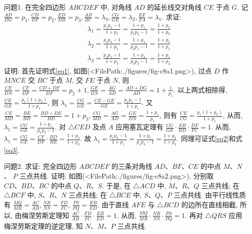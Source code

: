 
问题1. 在完全四边形 $A B C D E F$ 中, 对角线 $A D$ 的延长线交对角线 $C E$ 于点 $G$. 记 $\frac{A D}{D G}=p_1, \frac{C D}{D F}=p_2, \frac{E D}{D B}=p_3, \frac{A B}{B C}=\lambda_3, \frac{C G}{G E}=\lambda_2, \frac{E F}{F A}=\lambda_1$. 求证:
$$
\begin{aligned}
& \lambda_1=\frac{p_1 p_2-1}{1+p_1}=\frac{1+p_1}{p_1 p_3-1}=\frac{1+p_2}{1+p_3} \label{eq1} \\
& \lambda_2=\frac{p_2 p_3-1}{1+p_2}=\frac{1+p_2}{p_2 p_1-1}=\frac{1+p_3}{1+p_1} \label{eq2} \\
& \lambda_3=\frac{p_3 p_1-1}{1+p_3}=\frac{1+p_3}{p_3 p_2-1}=\frac{1+p_1}{1+p_2} \label{eq3}
\end{aligned}
$$
证明: 首先证明式\ref{eq1}, 如图(<FilePath:./figures/fig-c8a1.png>), 过点 $D$ 作 $M N C E$ 交 $B C$ 于点 $M$, 交 $F E$ 于点 $N$, 则 $\frac{C E}{D N}=\frac{C F}{D F}= \frac{C D+D F}{D F}=p_2+1, \frac{G E}{D N}=\frac{A G}{A D}=\frac{A D+D G}{A D}=1+ \frac{1}{p_1}$. 以上两式相除得, $\frac{C E}{G E}=\frac{p_1\left(1+p_2\right)}{1+p_1}$, 则 $\lambda_1=\frac{C G}{G E}= \frac{C E-G E}{G E}=\frac{p_1 p_2-1}{1+p_1}$. 又 $\frac{C E}{M D}=\frac{B E}{B D}=\frac{B D+D E}{B D}=1+p_3, \frac{C G}{M D}=\frac{A G}{A D}=\frac{G E}{D N}=\frac{1+p_1}{p_1}$, 则有 $\frac{C E}{C G}=\frac{p_1\left(1+p_3\right)}{1+p_1}$, 从而, $\lambda_1=\frac{C G}{G E}= \frac{1+p_1}{p_1 p_3-1}$. 对 $\triangle C E D$ 及点 $A$ 应用塞瓦定理有 $\frac{C G}{G E} \cdot \frac{E B}{B D} \cdot \frac{D F}{F C}=1$. 从而, $\lambda_1= \frac{C G}{G E}=\frac{C F}{D F} \cdot \frac{B D}{B E}=\frac{1+p_2}{1+p_3}$. 故 $\lambda_1=\frac{p_1 p_2-1}{1+p_1}=\frac{1+p_1}{p_1 p_3-1}=\frac{1+p_2}{1+p_3}$.
同理可证式\ref{eq2}和式\ref{eq3}.



问题2. 求证: 完全四边形 $A B C D E F$ 的三条对角线 $A D 、 B F 、 C E$ 的中点 $M 、 N$ 、 $P$ 三点共线.
证明: 如图(<FilePath:./figures/fig-c8a2.png>), 分别取 $C D 、 B D 、 B C$ 的中点 $Q 、 R 、 S$.
于是, 在 $\triangle A C D$ 中, $M 、 R 、 Q$ 三点共线; 在 $\triangle B C F$ 中, $S 、 R 、 N$ 三点共线; 在 $\triangle B C E$ 中, $S 、 Q 、 P$ 三点共线.
由平行线性质有 $\frac{M Q}{M R}=\frac{A C}{A B}, \frac{N R}{N S}=\frac{F D}{F C}$,
$\frac{P S}{P Q}=\frac{E B}{E D}$. 由于直线 $A F E$ 与 $\triangle B C D$ 的边所在直线相截, 所以, 由梅涅劳斯定理知 $\frac{A C}{A B} \cdot \frac{F D}{F C} \cdot \frac{E B}{E D}=1$. 从而, $\frac{M Q}{M R} \cdot \frac{N R}{N S} \cdot \frac{P S}{P Q}=1$.
再对 $\triangle Q R S$ 应用梅涅劳斯定理的逆定理, 知 $N 、 M 、 P$ 三点共线.



